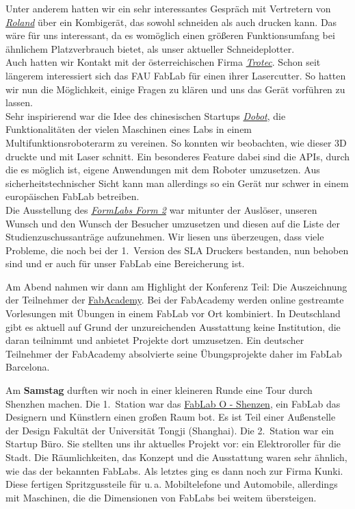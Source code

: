 \documentclass{\basedir/fablab-document}
\begin{document}
Unter anderem hatten wir ein sehr interessantes Gespräch mit Vertretern
von \href{http://www.rolanddg.com/}{\emph{Roland}} über ein Kombigerät,
das sowohl schneiden als auch drucken kann. Das wäre für uns
interessant, da es womöglich einen größeren Funktionsumfang bei
ähnlichem Platzverbrauch bietet, als unser aktueller Schneideplotter.\\
Auch hatten wir Kontakt mit der österreichischen Firma
\href{https://www.troteclaser.com/}{\emph{Trotec}}. Schon seit längerem
interessiert sich das FAU FabLab für einen ihrer Lasercutter. So hatten
wir nun die Möglichkeit, einige Fragen zu klären und uns das Gerät
vorführen zu lassen.\\
Sehr inspirierend war die Idee des chinesischen
Startups \href{http://dobot.cc/}{\emph{Dobot}}, die Funktionalitäten der
vielen Maschinen eines Labs in einem Multifunktionsroboterarm zu
vereinen. So konnten wir beobachten, wie dieser 3D druckte und mit Laser
schnitt. Ein besonderes Feature dabei sind die APIs, durch die es möglich
ist, eigene Anwendungen mit dem Roboter umzusetzen. Aus
sicherheitstechnischer Sicht kann man allerdings so ein Gerät nur schwer
in einem europäischen FabLab betreiben.\\
Die Ausstellung des
\href{https://formlabs.com/}{\emph{FormLabs Form 2}} war mitunter der
Auslöser, unseren Wunsch und den Wunsch der Besucher umzusetzen und diesen auf die Liste der
Studienzuschussanträge aufzunehmen. Wir liesen uns überzeugen, dass viele
Probleme, die noch bei der 1.\ Version des SLA Druckers bestanden, nun
behoben sind und er auch für unser FabLab eine Bereicherung ist.

Am Abend nahmen wir dann am Highlight der Konferenz Teil: Die
Auszeichnung der Teilnehmer der
\href{http://fabacademy.org/}{FabAcademy}. Bei der FabAcademy werden
online gestreamte Vorlesungen mit Übungen in einem FabLab vor Ort
kombiniert. In Deutschland gibt es aktuell auf Grund der unzureichenden
Ausstattung keine Institution, die daran teilnimmt und anbietet Projekte dort
umzusetzen. Ein deutscher Teilnehmer der FabAcademy absolvierte seine
Übungsprojekte daher im FabLab Barcelona.

Am \textbf{Samstag} durften wir noch in einer kleineren Runde eine Tour
durch Shenzhen machen. Die 1.\ Station war das
\href{https://www.fablabs.io/fablaboshenzhen}{FabLab O - Shenzen}, ein
FabLab das Designern und Künstlern einen großen Raum bot. Es ist
Teil einer Außenstelle der Design Fakultät der Universität Tongji
(Shanghai). Die 2.\ Station war ein Startup Büro. Sie stellten uns ihr
aktuelles Projekt vor: ein Elektroroller für die Stadt. Die
Räumlichkeiten, das Konzept und die Ausstattung waren sehr ähnlich, wie
das der bekannten FabLabs. Als letztes ging es dann noch zur Firma
Kunki. Diese fertigen Spritzgussteile für u.\,a. Mobiltelefone und
Automobile, allerdings mit Maschinen, die die Dimensionen von FabLabs
bei weitem übersteigen.
\end{document}
